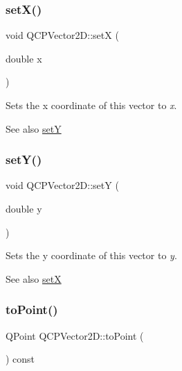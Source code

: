 \subsubsection{\texorpdfstring{set\+X()}{setX()}}
{\footnotesize\ttfamily void Q\+C\+P\+Vector2\+D\+::setX (\begin{DoxyParamCaption}\item[{double}]{x }\end{DoxyParamCaption})\hspace{0.3cm}{\ttfamily [inline]}}

Sets the x coordinate of this vector to {\itshape x}.

\begin{DoxySeeAlso}{See also}
\mbox{\hyperlink{class_q_c_p_vector2_d_ada288019aa8cd51e3b30acfc07b461dc}{setY}} 
\end{DoxySeeAlso}
\mbox{\label{class_q_c_p_vector2_d_ada288019aa8cd51e3b30acfc07b461dc}} 
\subsubsection{\texorpdfstring{set\+Y()}{setY()}}
{\footnotesize\ttfamily void Q\+C\+P\+Vector2\+D\+::setY (\begin{DoxyParamCaption}\item[{double}]{y }\end{DoxyParamCaption})\hspace{0.3cm}{\ttfamily [inline]}}

Sets the y coordinate of this vector to {\itshape y}.

\begin{DoxySeeAlso}{See also}
\mbox{\hyperlink{class_q_c_p_vector2_d_ab4249e6ce7bfc37be56f014c54b761ae}{setX}} 
\end{DoxySeeAlso}
\mbox{\label{class_q_c_p_vector2_d_add3edf75de9b7bf1abc693b973b2e906}} 
\subsubsection{\texorpdfstring{to\+Point()}{toPoint()}}
{\footnotesize\ttfamily Q\+Point Q\+C\+P\+Vector2\+D\+::to\+Point (\begin{DoxyParamCaption}{ }\end{DoxyParamCaption}) const\hspace{0.3cm}{\ttfamily [inline]}}

